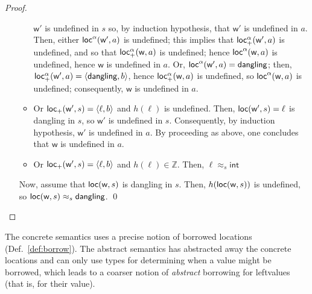 \begin{proof}
\begin{itemize}
\begin{itemize}
      $\mathsf{w}'$ is undefined in $s$ so, by induction hypothesis, that
      $\mathsf{w}'$ is undefined in $a$. Then, either $\mathsf{loc}^\alpha(\mathsf{w'},a)$ is
      undefined; this implies that $\mathsf{loc_+^\alpha}(\mathsf{w'},a)$ is undefined, and
      so that $\mathsf{loc_+^\alpha}(\mathsf{w},a)$ is undefined; hence
      $\mathsf{loc}^\alpha(\mathsf{w},a)$ is undefined, hence $\mathsf{w}$ is undefined in $a$.
      Or, $\mathsf{loc}^\alpha(\mathsf{w'},a)=\mathsf{dangling}$; then,
      $\mathsf{loc_+^\alpha}(\mathsf{w'},a)=\langle\mathsf{dangling},b\rangle$, hence
      $\mathsf{loc_+^\alpha}(\mathsf{w},a)$ is undefined, so $\mathsf{loc}^\alpha(\mathsf{w},a)$ is
      undefined; consequently, $\mathsf{w}$ is undefined in $a$.
      \item Or $\mathsf{loc_+}(\mathsf{w'},s)=\langle\ell,b\rangle$ and
      $h(\ell)$ is undefined. Then, $\mathsf{loc}(\mathsf{w'},s)=\ell$ is dangling
      in $s$, so $\mathsf{w'}$ is undefined in $s$. Consequently, by induction
      hypothesis, $\mathsf{w}'$ is undefined in $a$. By proceeding as above,
      one concludes that $\mathsf{w}$ is undefined in $a$.
      \item Or $\mathsf{loc_+}(\mathsf{w'},s)=\langle\ell,b\rangle$ and
      $h(\ell)\in\mathbb{Z}$. Then, $\ell \approx_s \mathsf{int}$
    \end{itemize}
    Now, assume that $\mathsf{loc}(\mathsf{w},s)$ is dangling in $s$. Then,
    $h(\mathsf{loc}(\mathsf{w},s))$ is undefined, so
    $\mathsf{loc}(\mathsf{w},s) \approx_s \mathsf{dangling}$.
    \qed
  \end{itemize}
\end{proof}

The concrete semantics uses a precise notion of borrowed locations
(Def.~\ref{def:borrow}). The abstract semantics has abstracted away the concrete locations
and can only use types for determining when a value might be borrowed, which leads
to a coarser notion of \emph{abstract} borrowing for leftvalues (that is, for their value).

